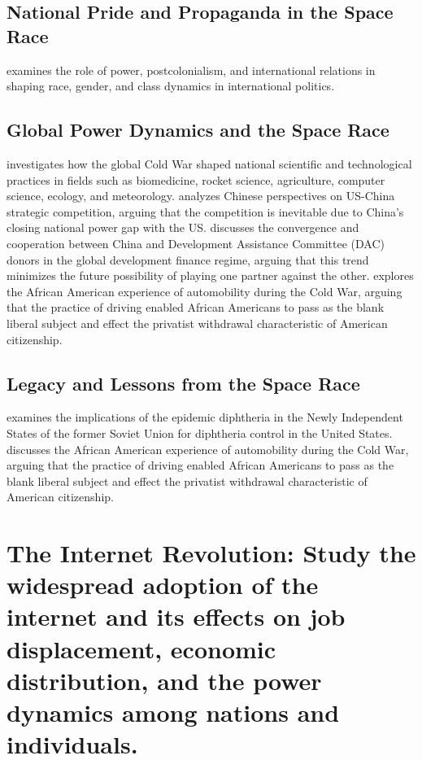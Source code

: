 \documentclass{article}
\begin{document}
\subsection{National Pride and Propaganda in the Space Race}

\cite{Chowdhry2013PowerPA} examines the role of power, postcolonialism, and international relations in shaping race, gender, and class dynamics in international politics.

\subsection{Global Power Dynamics and the Space Race}

\cite{Oreskes2014ScienceAT} investigates how the global Cold War shaped national scientific and technological practices in fields such as biomedicine, rocket science, agriculture, computer science, ecology, and meteorology. \cite{Zhao2019IsAN} analyzes Chinese perspectives on US-China strategic competition, arguing that the competition is inevitable due to China's closing national power gap with the US. \cite{Kragelund2015TowardsCA} discusses the convergence and cooperation between China and Development Assistance Committee (DAC) donors in the global development finance regime, arguing that this trend minimizes the future possibility of playing one partner against the other. \cite{Brzezinski2012StrategicVA} explores the African American experience of automobility during the Cold War, arguing that the practice of driving enabled African Americans to pass as the blank liberal subject and effect the privatist withdrawal characteristic of American citizenship.

\subsection{Legacy and Lessons from the Space Race}

\cite{Golaz2000EpidemicDI} examines the implications of the epidemic diphtheria in the Newly Independent States of the former Soviet Union for diphtheria control in the United States. \cite{Seiler2007SoTW} discusses the African American experience of automobility during the Cold War, arguing that the practice of driving enabled African Americans to pass as the blank liberal subject and effect the privatist withdrawal characteristic of American citizenship.


\section{The Internet Revolution: Study the widespread adoption of the internet and its effects on job displacement, economic distribution, and the power dynamics among nations and individuals.}
\end{document}
